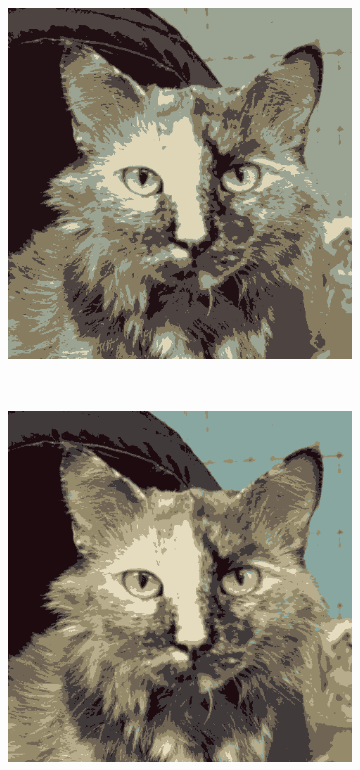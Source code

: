\begin{figure}[htb]
\begin{subfigure}{.3\textwidth}
    \end{subfigure}
    \begin{subfigure}{.3\textwidth}
        \includegraphics[width=\linewidth]{../../python_code/plots/kmeans/cat-10/reconstruction-5.png}
    \end{subfigure}\\
    \vspace{1mm}
    \begin{subfigure}{.3\textwidth}
        \includegraphics[width=\linewidth]{../../python_code/plots/kmeans/cat-10/reconstruction-7.png}

\end{subfigure}
\end{figure}
